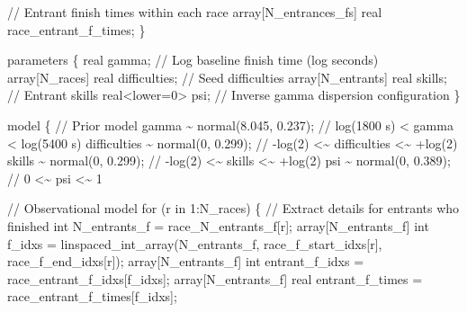 \documentclass[
  letterpaper,
  DIV=11,
  numbers=noendperiod]{scrartcl}
\newenvironment{Shaded}{\begin{snugshade}}{\end{snugshade}}
\newcommand{\CommentTok}[1]{\textcolor[rgb]{0.37,0.37,0.37}{#1}}
\newcommand{\ControlFlowTok}[1]{\textcolor[rgb]{0.00,0.23,0.31}{#1}}
\newcommand{\DataTypeTok}[1]{\textcolor[rgb]{0.68,0.00,0.00}{#1}}
\newcommand{\DecValTok}[1]{\textcolor[rgb]{0.68,0.00,0.00}{#1}}
\newcommand{\FloatTok}[1]{\textcolor[rgb]{0.68,0.00,0.00}{#1}}
\newcommand{\KeywordTok}[1]{\textcolor[rgb]{0.00,0.23,0.31}{#1}}
\newcommand{\NormalTok}[1]{\textcolor[rgb]{0.00,0.23,0.31}{#1}}
\begin{document}
\begin{codelisting}
\begin{Shaded}
\begin{Highlighting}[]
  \CommentTok{// Entrant finish times within each race}
  \DataTypeTok{array}\NormalTok{[N\_entrances\_fs] }\DataTypeTok{real}\NormalTok{ race\_entrant\_f\_times;}
\NormalTok{\}}

\KeywordTok{parameters}\NormalTok{ \{}
  \DataTypeTok{real}\NormalTok{ gamma;                       }\CommentTok{// Log baseline finish time (log seconds)}
  \DataTypeTok{array}\NormalTok{[N\_races] }\DataTypeTok{real}\NormalTok{ difficulties; }\CommentTok{// Seed difficulties}
  \DataTypeTok{array}\NormalTok{[N\_entrants] }\DataTypeTok{real}\NormalTok{ skills;    }\CommentTok{// Entrant skills}
  \DataTypeTok{real}\NormalTok{\textless{}}\KeywordTok{lower}\NormalTok{=}\DecValTok{0}\NormalTok{\textgreater{} psi;                }\CommentTok{// Inverse gamma dispersion configuration}
\NormalTok{\}}

\KeywordTok{model}\NormalTok{ \{}
  \CommentTok{// Prior model}
\NormalTok{  gamma \textasciitilde{} normal(}\FloatTok{8.045}\NormalTok{, }\FloatTok{0.237}\NormalTok{);    }\CommentTok{// log(1800 s) \textless{} gamma \textless{} log(5400 s)}
\NormalTok{  difficulties \textasciitilde{} normal(}\DecValTok{0}\NormalTok{, }\FloatTok{0.299}\NormalTok{); }\CommentTok{// {-}log(2) \textless{}\textasciitilde{} difficulties \textless{}\textasciitilde{} +log(2)}
\NormalTok{  skills \textasciitilde{} normal(}\DecValTok{0}\NormalTok{, }\FloatTok{0.299}\NormalTok{);       }\CommentTok{// {-}log(2) \textless{}\textasciitilde{}    skills    \textless{}\textasciitilde{} +log(2)}
\NormalTok{  psi \textasciitilde{} normal(}\DecValTok{0}\NormalTok{, }\FloatTok{0.389}\NormalTok{);          }\CommentTok{// 0 \textless{}\textasciitilde{} psi \textless{}\textasciitilde{} 1}

  \CommentTok{// Observational model}
  \ControlFlowTok{for}\NormalTok{ (r }\ControlFlowTok{in} \DecValTok{1}\NormalTok{:N\_races) \{}
    \CommentTok{// Extract details for entrants who finished}
    \DataTypeTok{int}\NormalTok{ N\_entrants\_f = race\_N\_entrants\_f[r];}
    \DataTypeTok{array}\NormalTok{[N\_entrants\_f] }\DataTypeTok{int}\NormalTok{ f\_idxs = linspaced\_int\_array(N\_entrants\_f,}
\NormalTok{                                                         race\_f\_start\_idxs[r],}
\NormalTok{                                                         race\_f\_end\_idxs[r]);}
    \DataTypeTok{array}\NormalTok{[N\_entrants\_f] }\DataTypeTok{int}\NormalTok{ entrant\_f\_idxs = race\_entrant\_f\_idxs[f\_idxs];}
    \DataTypeTok{array}\NormalTok{[N\_entrants\_f] }\DataTypeTok{real}\NormalTok{ entrant\_f\_times = race\_entrant\_f\_times[f\_idxs];}


\end{Highlighting}
\end{Shaded}
\end{codelisting}
\end{document}

